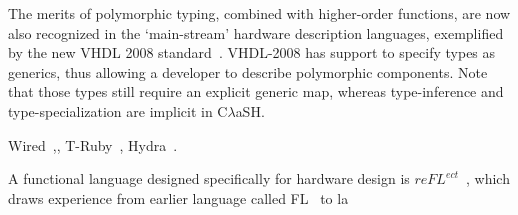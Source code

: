 \documentclass[conference]{IEEEtran}
\begin{document}
The merits of polymorphic typing, combined with higher-order functions, are now also recognized in the `main-stream' hardware description languages, exemplified by the new VHDL 2008 standard~\cite{VHDL2008}. VHDL-2008 has support to specify types as generics, thus allowing a developer to describe polymorphic components. Note that those types still require an explicit generic map, whereas type-inference and type-specialization are implicit in C$\lambda$aSH.

Wired~\cite{Wired},, T-Ruby~\cite{T-Ruby}, Hydra~\cite{Hydra}. 

A functional language designed specifically for hardware design is $re{\mathit{FL}}^{ect}$~\cite{reFLect}, which draws experience from earlier language called FL~\cite{FL} to la

%
%



%
%
\end{document}
